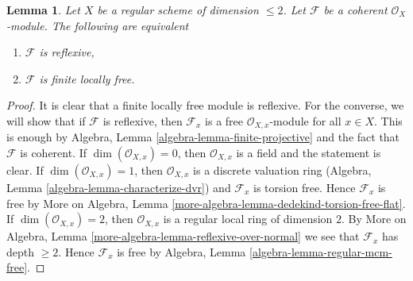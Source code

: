 \documentclass[10pt,a4paper]{amsart}
\theoremstyle{plain}
\newtheorem{lemma}[subsection]{Lemma}
\theoremstyle{definition}
\theoremstyle{remark}
\numberwithin{equation}{subsection}
\begin{document}
\begin{lemma}
\label{lemma-reflexive-over-regular-dim-2}
Let $X$ be a regular scheme of dimension $\leq 2$.
Let $\mathcal{F}$ be a coherent $\mathcal{O}_X$-module.
The following are equivalent
\begin{enumerate}
\item $\mathcal{F}$ is reflexive,
\item $\mathcal{F}$ is finite locally free.
\end{enumerate}
\end{lemma}

\begin{proof}
It is clear that a finite locally free module is reflexive.
For the converse, we will show that if $\mathcal{F}$ is
reflexive, then $\mathcal{F}_x$ is a free $\mathcal{O}_{X, x}$-module
for all $x \in X$. This is enough by
Algebra, Lemma \ref{algebra-lemma-finite-projective}
and the fact that $\mathcal{F}$ is coherent.
If $\dim(\mathcal{O}_{X, x}) = 0$, then
$\mathcal{O}_{X, x}$ is a field and the statement is clear.
If $\dim(\mathcal{O}_{X, x}) = 1$, then $\mathcal{O}_{X, x}$
is a discrete valuation ring
(Algebra, Lemma \ref{algebra-lemma-characterize-dvr})
and $\mathcal{F}_x$ is torsion free.
Hence $\mathcal{F}_x$ is free by More on Algebra, Lemma
\ref{more-algebra-lemma-dedekind-torsion-free-flat}.
If $\dim(\mathcal{O}_{X, x}) = 2$, then $\mathcal{O}_{X, x}$
is a regular local ring of dimension $2$. By
More on Algebra, Lemma \ref{more-algebra-lemma-reflexive-over-normal}
we see that $\mathcal{F}_x$ has depth $\geq 2$.
Hence $\mathcal{F}_x$ is free by
Algebra, Lemma \ref{algebra-lemma-regular-mcm-free}.
\end{proof}
\end{document}
